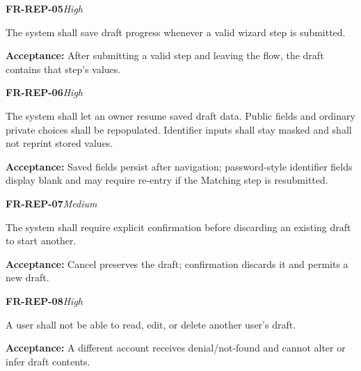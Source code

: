 \documentclass[12pt,a4paper,oneside]{report}
\begin{document}
\noindent\begin{minipage}{\linewidth}\textbf{FR-REP-05}\hfill\textit{High}\par\nopagebreak

The system shall save draft progress whenever a valid wizard step is submitted.

{\color{muted}\textbf{Acceptance:} After submitting a valid step and leaving the flow, the draft contains that step's values.\par}\end{minipage}\par\vspace{5pt}

\noindent\begin{minipage}{\linewidth}\textbf{FR-REP-06}\hfill\textit{High}\par\nopagebreak

The system shall let an owner resume saved draft data. Public fields and ordinary private choices shall be repopulated. Identifier inputs shall stay masked and shall not reprint stored values.

{\color{muted}\textbf{Acceptance:} Saved fields persist after navigation; password-style identifier fields display blank and may require re-entry if the Matching step is resubmitted.\par}\end{minipage}\par\vspace{5pt}

\noindent\begin{minipage}{\linewidth}\textbf{FR-REP-07}\hfill\textit{Medium}\par\nopagebreak

The system shall require explicit confirmation before discarding an existing draft to start another.

{\color{muted}\textbf{Acceptance:} Cancel preserves the draft; confirmation discards it and permits a new draft.\par}\end{minipage}\par\vspace{5pt}

\noindent\begin{minipage}{\linewidth}\textbf{FR-REP-08}\hfill\textit{High}\par\nopagebreak

A user shall not be able to read, edit, or delete another user's draft.

{\color{muted}\textbf{Acceptance:} A different account receives denial/not-found and cannot alter or infer draft contents.\par}\end{minipage}\par\vspace{5pt}
\end{document}
